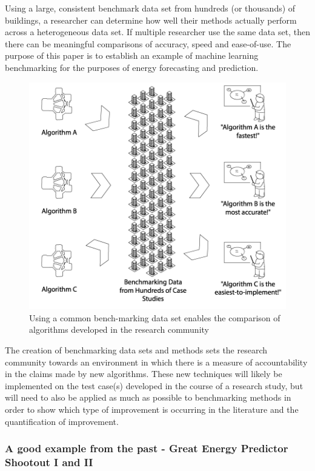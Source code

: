 \documentclass[preprint,12pt]{elsarticle}
\begin{document}
Using a large, consistent benchmark data set from hundreds (or thousands) of buildings, a researcher can determine how well their methods actually perform across a heterogeneous data set. If multiple researcher use the same data set, then there can be meaningful comparisons of accuracy, speed and ease-of-use. The purpose of this paper is to establish an example of machine learning benchmarking for the purposes of energy forecasting and prediction.

\begin{figure}[ht!]
\begin{center}
\includegraphics[width=1\columnwidth]{figures/NewWay}
\caption{Using a common bench-marking data set enables the comparison of algorithms developed in the research community}
\label{fig:newway}%
\end{center}
\end{figure}

The creation of benchmarking data sets and methods sets the research community towards an environment in which there is a measure of accountability in the claims made by new algorithms. These new techniques will likely be implemented on the test case(s) developed in the course of a research study, but will need to also be applied as much as possible to benchmarking methods in order to show which type of improvement is occurring in the literature and the quantification of improvement. 

\subsubsection{A good example from the past - Great Energy Predictor Shootout I and II}
\end{document}
